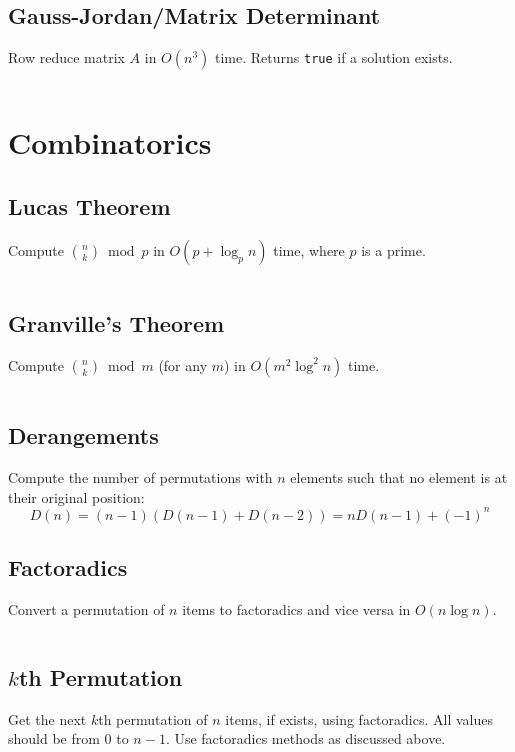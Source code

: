 \documentclass[8pt,a4paper,landscape,oneside]{amsart}
\newcommand{\code}[1]{\inputminted[fontsize=\normalsize,baselinestretch=1]{cpp}{_code/#1}}
\begin{document}
\begin{multicols*}{3}
  \subsection{Gauss-Jordan/Matrix Determinant}
    Row reduce matrix $A$ in $O(n^3)$ time. Returns \texttt{true} if a solution exists.
    \code{algebra/gauss-jordan.java}
\section{Combinatorics}
  \subsection{Lucas Theorem}
    Compute $\binom{n}{k} \bmod{p}$ in $O(p + \log_p n)$ time, where $p$ is a prime.
    \code{combs/lucas.cpp}
  \subsection{Granville's Theorem}
    Compute $\binom{n}{k} \bmod{m}$ (for any $m$) in $O(m^2 \log^2 n)$ time.
    \code{combs/granville.py}
  \subsection{Derangements}
    Compute the number of permutations with $n$ elements such that no element is at their original position:
    \[
    D(n) = (n-1) \left( D(n-1) + D(n-2) \right) =  n D(n-1) + (-1)^n
    \]
    \subsection{Factoradics}
    Convert a permutation of $n$ items to factoradics and vice versa in $O(n \log n)$.
    \code{combs/factoradics.cpp}
  \subsection{$k$th Permutation}
    Get the next $k$th permutation of $n$ items, if exists, using factoradics. All values should be from $0$ to $n-1$. Use factoradics methods as discussed above.
    \code{combs/kth-permutation.cpp}

\end{multicols*}
\end{document}
